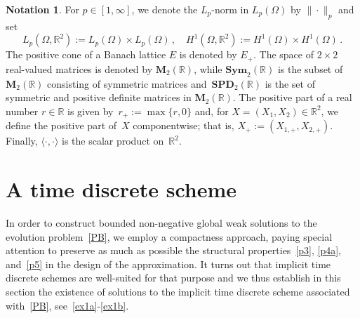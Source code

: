 \documentclass[10pt]{amsart}
\theoremstyle{definition}\newtheorem{defi}[theo]{Definition}\newtheorem{rema}[theo]{Remark}\newtheorem{exam}[theo]{Example}\newtheorem{exem}[theo]{Example}\newtheorem{nota}[theo]{Notation}
\newcommand{\bbR}{\mathbb{R}}
\newcommand{\bfM}{\mathbf{M}}
\newcommand{\bSym}{\mathbf{Sym}}
\newcommand{\bSPD}{\mathbf{SPD}}
\begin{document}

\begin{nota}
For $p\in [1,\infty]$, we denote the $L_p$-norm in $L_p(\Omega)$ by $\|\cdot\|_p$ and set
\begin{equation*}
L_p\left(\Omega,\bbR^2\right) := L_p(\Omega)\times L_p(\Omega)\,, \quad H^1\left(\Omega,\bbR^2\right):= H^1(\Omega)\times H^1(\Omega)\,.
\end{equation*}
The positive cone of a Banach lattice $E$ is denoted by $E_+$. The space of $2\times 2$ real-valued matrices is denoted by ${\bfM_2(\bbR)}$, while ${\bSym_2(\bbR)}$ is the subset of ${\bfM_2(\bbR)}$ consisting of symmetric matrices and~${\bSPD_2(\bbR)}$ is the set of symmetric and positive definite matrices in $\bfM_2(\bbR)$. The positive part of a real number $r\in\bbR$ is given by~${r_+:=\max\{r,0\}}$ and, for $X=(X_1,X_2)\in\bbR^2$, we define the positive part of~$X$ componentwise; that is, ${X_+:=(X_{1,+}, X_{2,+})}$. Finally, $\langle \cdot,\cdot \rangle$ is the scalar product on~$\bbR^2$.
\end{nota}


\section{A time discrete scheme}\label{sec2}



In order to construct bounded non-negative global weak solutions to the evolution problem~\eqref{PB}, we employ a compactness approach, paying special attention to preserve as much as possible the structural properties~\eqref{p3}, \eqref{p4a}, and~\eqref{p5} in the design of the approximation. It turns out that implicit time discrete schemes are well-suited for that purpose and we thus establish in this section the existence of solutions to the implicit time discrete scheme associated with~\eqref{PB}, see~\eqref{ex1a}-\eqref{ex1b}.
\end{document}
